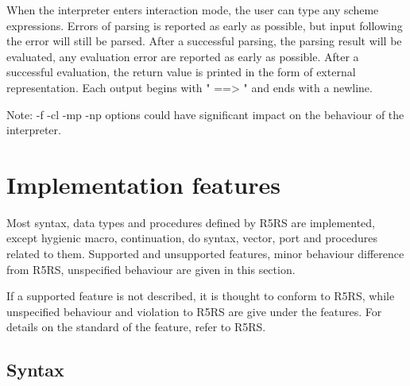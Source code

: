 \documentclass{article}
\begin{document}
	When the interpreter enters interaction mode, the user can type any scheme expressions. Errors of parsing is reported as early as possible, but input following the error will still be parsed. After a successful parsing, the parsing result will be evaluated, any evaluation error are reported as early as possible. After a successful evaluation, the return value is printed in the form of external representation. Each output begins with " ==> " and ends with a newline.
	
	Note: -f -cl -mp -np options could have significant impact on the behaviour of the interpreter.

\section{Implementation features}

Most syntax, data types and procedures defined by R5RS are implemented, except hygienic macro, continuation, do syntax, vector, port and procedures related to them. Supported and unsupported features, minor behaviour difference from R5RS, unspecified behaviour are given in this section.

If a supported feature is not described, it is thought to conform to R5RS, while unspecified behaviour and violation to R5RS are give under the features. For details on the standard of the feature, refer to R5RS.

\subsection{Syntax}
\end{document}
